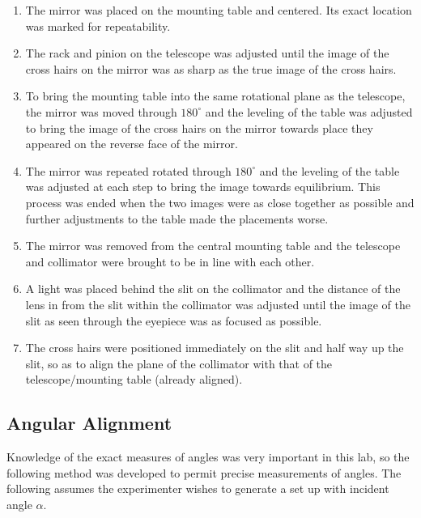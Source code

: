 \documentclass[paper=a4, fontsize=11pt]{scrartcl} %
\numberwithin{equation}{section}
\numberwithin{figure}{section}
\numberwithin{table}{section}
\begin{document}
\begin{enumerate}
\item The mirror was placed on the mounting table and centered. Its exact location was marked for repeatability.
\item The rack and pinion on the telescope was adjusted until the image of the cross hairs on the mirror was as sharp as the true image of the cross hairs.
\item To bring the mounting table into the same rotational plane as the telescope, the mirror was moved through $180^\circ$ and the leveling of the table was adjusted to bring the image of the cross hairs on the mirror towards place they appeared on the reverse face of the mirror.
\item The mirror was repeated rotated through $180^\circ$ and the leveling of the table was adjusted at each step to bring the image towards equilibrium. This process was ended when the two images were as close together as possible and further adjustments to the table made the placements worse.
\item The mirror was removed from the central mounting table and the telescope and collimator were brought to be in line with each other.
\item A light was placed behind the slit on the collimator and the distance of the lens in from the slit within the collimator was adjusted until the image of the slit as seen through the eyepiece was as focused as possible.
\item The cross hairs were positioned immediately on the slit and half way up the slit, so as to align the plane of the collimator with that of the telescope/mounting table (already aligned).
\end{enumerate}


\subsection{Angular Alignment}
Knowledge of the exact measures of angles was very important in this lab, so the following method was developed to permit precise measurements of angles. The following assumes the experimenter wishes to generate a set up with incident angle $\alpha$.
\end{document}
